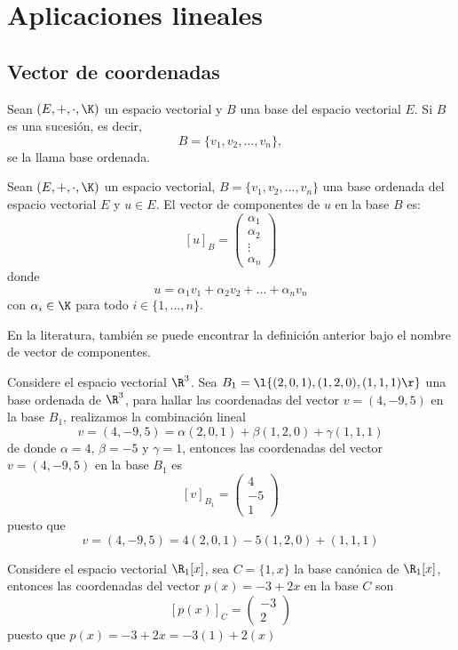 \documentclass[compacto,10pt]{pubciencias-notas}
\begin{document}
\encabezado
\vspace*{-8mm}
\setcounter{section}{5}
\section{Aplicaciones lineales}
\setcounter{subsection}{4}
\subsection{Vector de coordenadas}

\begin{defi}
    Sean $(E,+,\cdot,\K)$ un espacio vectorial y $B$ una base del espacio vectorial $E$. Si $B$ es una sucesión, es decir,
    \[
        B = \{v_1,v_2,\ldots,v_n\},
    \]
    se la llama base ordenada.
\end{defi}

\begin{defi}
    Sean $(E,+,\cdot,\K)$ un espacio vectorial, $B = \{v_1,v_2,\ldots,v_n\}$ una base ordenada del espacio vectorial $E$ y $u\in E$. El vector de componentes de $u$ en la base $B$ es:
    \[
    [u]_{B}=    \begin{pmatrix}
            \alpha_1\\\alpha_2\\\vdots\\\alpha_n
        \end{pmatrix}
    \]
    donde
    \[
        u = \alpha_1 v_1+\alpha_2 v_2+\ldots+\alpha_n v_n
    \]
    con $\alpha_{i} \in \K$ para todo $i\in\{1,\ldots,n\}$.
\end{defi}

\begin{advertencia}
    En la literatura, también se puede encontrar la definición anterior bajo el nombre de vector de componentes.
\end{advertencia}

\begin{ejem}\hspace{0pt}
Considere el espacio vectorial $\R^{3}$. Sea $B_{1} = \l\{(2,0,1), (1,2,0), (1,1,1)\r\}$ una base ordenada de $\R^{3}$, para hallar las coordenadas del vector $v=(4,-9,5)$ en la base $B_1$, realizamos la combinaci\'on lineal 
\[
v=(4,-9,5)=\alpha(2,0,1)+\beta(1,2,0)+\gamma(1,1,1)
\]
de donde $\alpha=4$, $\beta=-5$ y $\gamma=1$,
entonces las coordenadas del vector $v = (4,- 9,5)$ en la base $B_{1}$ es
    \[
        [v]_{B_{1}} = \begin{pmatrix}4\\-5\\1\end{pmatrix}
    \]
 puesto que    
\[
v=(4,-9,5)=4(2,0,1)-5(1,2,0)+(1,1,1)
\]
 \end{ejem}
\begin{ejem}
Considere el espacio vectorial $\R_1[x]$, sea $C=\{1,x\}$ la base can\'onica de $\R_1[x]$, entonces las coordenadas del vector $p(x)=-3+2x$ en la base $C$ son
    \[
        [p(x)]_{C} = \begin{pmatrix}-3\\2\end{pmatrix}
    \]
puesto que $p(x)=-3+2x=-3(1)+2(x)$
\end{ejem}
\end{document}
